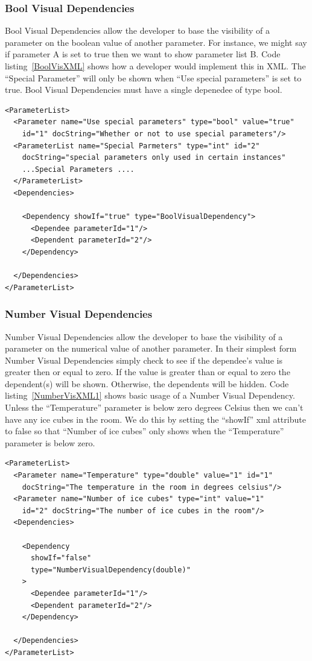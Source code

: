 \subsubsection{Bool Visual Dependencies}
Bool Visual Dependencies allow the developer to base the visibility of a parameter on the boolean value of another parameter. For instance, we might say
if parameter A is set to true then we want to show parameter list B. Code listing~\ref{BoolVisXML} shows how a developer would implement this in XML. The
``Special Parameter'' will only be shown when ``Use special parameters'' is set to true. Bool Visual Dependencies must have a single depenedee of type bool.
\begin{lstlisting}[caption={Example usage of a Bool Visual Dependency}, label=BoolVisXML]
<ParameterList>
  <Parameter name="Use special parameters" type="bool" value="true"
    id="1" docString="Whether or not to use special parameters"/>
  <ParameterList name="Special Parmeters" type="int" id="2"
    docString="special parameters only used in certain instances" 
    ...Special Parameters ....
  </ParameterList>
  <Dependencies>

    <Dependency showIf="true" type="BoolVisualDependency">
      <Dependee parameterId="1"/>
      <Dependent parameterId="2"/>
    </Dependency>

  </Dependencies>
</ParameterList>
\end{lstlisting}

\subsubsection{Number Visual Dependencies}
Number Visual Dependencies allow the developer to base the visibility of a parameter on the numerical value of another parameter. In their simplest form
Number Visual Dependencies simply check to see if the dependee's value is greater then or equal to zero. If the value is greater than or equal to zero the
dependent(s) will be shown. Otherwise, the dependents will be hidden.
Code listing~\ref{NumberVisXML1} shows basic usage of a Number Visual Dependency. Unless the ``Temperature'' parameter is below zero degrees
Celsius then we can't have any ice cubes in the room. We do this by setting the ``showIf'' xml attribute to false so that ``Number of ice cubes'' only shows
when the ``Temperature'' parameter is below zero.
\begin{lstlisting}[caption={Example usage of a Number Visual Dependency}, label=NumberVisXML1]
<ParameterList>
  <Parameter name="Temperature" type="double" value="1" id="1" 
    docString="The temperature in the room in degrees celsius"/>
  <Parameter name="Number of ice cubes" type="int" value="1"
    id="2" docString="The number of ice cubes in the room"/>
  <Dependencies>

    <Dependency 
      showIf="false" 
      type="NumberVisualDependency(double)"
    >
      <Dependee parameterId="1"/>
      <Dependent parameterId="2"/>
    </Dependency>

  </Dependencies>
</ParameterList>
\end{lstlisting}

